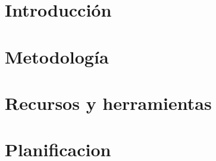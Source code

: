\section{Introducción}

\section{Metodología}

\section{Recursos y herramientas}


\section{Planificacion}